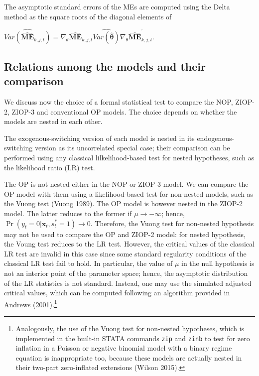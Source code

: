 \documentclass[letterpaper,fleqn,12pt]{article}
\begin{document}
The asymptotic standard errors of the MEs are computed using the Delta
method as the square roots of the diagonal elements of

\begin{center}
$\widehat{Var(\underset{}{\widehat{\mathbf{ME}}_{k,j,t}})}=\nabla _{\theta }%
\widehat{\mathbf{ME}}_{k,j,t}\widehat{Var(\widehat{\mathbf{\theta }})}\nabla
_{\theta }\widehat{\mathbf{ME}}_{k,j,t}^{^{\prime }}$.
\end{center}

\subsection{\noindent Relations among the models and their comparison}

We discuss now the choice of a formal statistical test to compare the NOP,
ZIOP-2, ZIOP-3 and conventional OP models. The choice depends on whether the
models are nested in each other.

The exogenous-switching version of each model is nested in its
endogenous-switching version as its uncorrelated special case; their
comparison can be performed using any classical lilkelihood-based test for
nested hypotheses, such as the likelihood ratio (LR) test.

The OP is not nested either in the NOP or ZIOP-3 model. We can compare the
OP model with them using a likelihood-based test for non-nested models, such
as the Vuong test (Vuong 1989). The OP model is however nested in the ZIOP-2
model. The latter reduces to the former if $\mu \rightarrow -\infty $;
hence, $\Pr (y_{t}=0|\mathbf{x}_{t},s_{t}^{\ast }=1)\rightarrow 0$.
Therefore, the Vuong test for non-nested hypothesis may not be used to
compare the OP and ZIOP-2 model: for nested hypothesis, the Voung test
reduces to the LR test. However, the critical values of the classical LR
test are invalid in this case since some standard regularity conditions of
the classical LR test fail to hold. In particular, the value of $\mu $ in
the null hypothesis is not an interior point of the parameter space; hence,
the asymptotic distribution of the LR statistics is not standard. Instead,
one may use the simulated adjusted critical values, which can be computed
following an algorithm provided in Andrews (2001).\footnote{%
Analogously, the use of the Vuong test for non-nested hypotheses, which is
implemented in the built-in STATA commands \texttt{zip} and \texttt{zinb} to
test for zero inflation in a Poisson or negative binomial model with a
binary regime equation is inappropriate too, because these models are
actually nested in their two-part zero-inflated extensions (Wilson 2015).}
\end{document}
